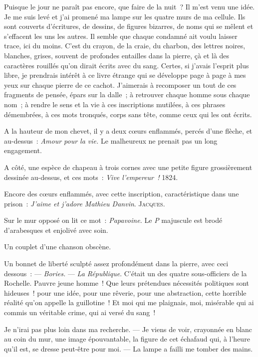 \documentclass[french,twoside]{book} %
\begin{document}
\noindent Puisque le jour ne paraît pas encore, que faire de la nuit ? Il m’est venu une idée. Je me suis levé et j’ai promené ma lampe sur les quatre murs de ma cellule. Ils sont couverts d’écritures, de dessins, de figures bizarres, de noms qui se mêlent et s’effacent les uns les autres. Il semble que chaque condamné ait voulu laisser trace, ici du moins. C’est du crayon, de la craie, du charbon, des lettres noires, blanches, grises, souvent de profondes entailles dans la pierre, çà et là des caractères rouillés qu’on dirait écrits avec du sang. Certes, si j’avais l’esprit plus libre, je prendrais intérêt à ce livre étrange qui se développe page à page à mes yeux sur chaque pierre de ce cachot. J’aimerais à recomposer un tout de ces fragments de pensée, épars sur la dalle ; à retrouver chaque homme sous chaque nom ; à rendre le sens et la vie à ces inscriptions mutilées, à ces phrases démembrées, à ces mots tronqués, corps sans tête, comme ceux qui les ont écrits.\par
 A la hauteur de mon chevet, il y a deux cœurs enflammés, percés d’une flèche, et au-dessus : \emph{Amour pour la vie.} Le malheureux ne prenait pas un long engagement.\par
A côté, une espèce de chapeau à trois cornes avec une petite figure grossièrement dessinée au-dessus, et ces mots : \emph{Vive l’empereur !} 1824.\par
Encore des cœurs enflammés, avec cette inscription, caractéristique dans une prison : \emph{J’aime et j’adore Mathieu Danvin}. J{\scshape acques}.\par
Sur le mur opposé on lit ce mot : \emph{Papavoine.} Le \emph{P }majuscule est brodé d’arabesques et enjolivé avec soin.\par
Un couplet d’une chanson obscène.\par
Un bonnet de liberté sculpté assez profondément dans la pierre, avec ceci dessous : — \emph{Bories.} — \emph{La République}. C’était un des quatre sous-officiers de la Rochelle. Pauvre jeune homme ! Que leurs prétendues nécessités politiques sont hideuses ! pour une idée, pour une rêverie, pour une abstraction, cette horrible réalité qu’on appelle la guillotine ! Et moi qui me plaignais, moi, misérable qui ai commis un véritable crime, qui ai versé du sang !\par
Je n’irai pas plus loin dans ma recherche. — Je viens de voir, crayonnée en blanc au coin du mur, une image épouvantable, la figure de cet échafaud qui, à l’heure qu’il est, se dresse peut-être pour moi. — La lampe a failli me tomber des mains.
\end{document}
